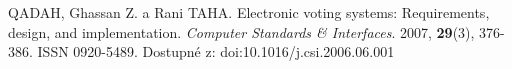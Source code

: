 \begin{thebibliography}{1}

QADAH, Ghassan Z. a Rani TAHA. Electronic voting systems: Requirements, design, and implementation. \textit{Computer Standards & Interfaces}. 2007, \textbf{29}(3), 376-386. ISSN 0920-5489. Dostupné z: doi:10.1016/j.csi.2006.06.001

\end{thebibliography}